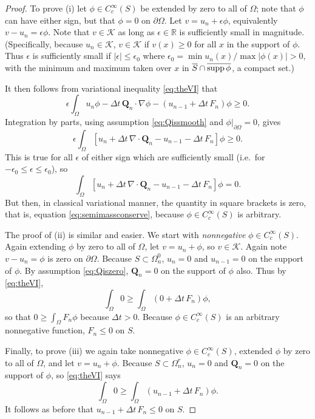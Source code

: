 \documentclass[final,leqno,onefignum,onetabnum]{siamltex1213bueler}
\newcommand\bQ{\mathbf{Q}}
\newcommand{\Div}{\nabla\cdot}
\newcommand\eps{\epsilon}
\renewcommand{\grad}{\nabla}
\newcommand\RR{\mathbb{R}}
\begin{document}
\begin{proof}  To prove (i) let $\phi\in C_c^\infty(S)$ be extended by zero to all of $\Omega$; note that $\phi$ can have either sign, but that $\phi=0$ on $\partial\Omega$.  Let $v = u_n + \eps \phi$, equivalently $v-u_n = \eps \phi$.  Note that $v \in \mathcal{K}$ as long as $\eps\in\RR$ is sufficiently small in magnitude.  (Specifically, because $u_n\in\mathcal{K}$, $v\in\mathcal{K}$ if $v(x)\ge 0$ for all $x$ in the support of $\phi$.  Thus $\eps$ is sufficiently small if $|\eps|\le \eps_0$ where $\eps_0 = \min u_n(x) / \max |\phi(x)| > 0$, with the minimum and maximum taken over $x$ in $\overline{S}\cap \overline{\supp \phi}$, a compact set.)

It then follows from variational inequality \eqref{eq:theVI} that
   $$\eps \int_\Omega u_n \phi - \Delta t\,\bQ_n \cdot \grad \phi - (u_{n-1} + \Delta t\,F_n)\phi \ge 0.$$
Integration by parts, using assumption \eqref{eq:Qissmooth} and $\phi\big|_{\partial\Omega}=0$, gives
   $$\eps \int_\Omega \left[u_n + \Delta t\,\Div\bQ_n - u_{n-1} - \Delta t\,F_n \right]\phi \ge 0.$$
This is true for all $\eps$ of either sign which are sufficiently small (i.e.~for $-\eps_0 \le \eps \le \eps_0$), so
   $$\int_\Omega \left[u_n + \Delta t\,\Div\bQ_n - u_{n-1} - \Delta t\,F_n\right]\phi = 0.$$
But then, in classical variational manner, the quantity in square brackets is zero, that is, equation \eqref{eq:semimassconserve}, because $\phi\in C_c^\infty(S)$ is arbitrary.

The proof of (ii) is similar and easier.  We start with \emph{nonnegative} $\phi\in C_c^\infty(S)$.  Again extending $\phi$ by zero to all of $\Omega$, let $v = u_n + \phi$, so $v\in\mathcal{K}$.  Again note $v-u_n=\phi$ is zero on $\partial \Omega$.  Because $S\subset \Omega_n^0$, $u_n=0$ and $u_{n-1}=0$ on the support of $\phi$.  By assumption \eqref{eq:Qiszero}, $\bQ_n=0$ on the support of $\phi$ also.  Thus by \eqref{eq:theVI},
    $$\int_{\Omega} 0 \ge \int_{\Omega} \left(0 + \Delta t\, F_n\right) \phi,$$
so that $0 \ge \int_{\Omega} F_n \phi$ because $\Delta t>0$.  Because $\phi\in C_c^\infty(S)$ is an arbitrary nonnegative function, $F_n \le 0$ on $S$.

Finally, to prove (iii) we again take nonnegative $\phi\in C_c^\infty(S)$, extended $\phi$ by zero to all of $\Omega$, and let $v=u_n+\phi$.  Because $S\subset \Omega_n^r$, $u_n=0$ and $\bQ_n=0$ on the support of $\phi$, so \eqref{eq:theVI} says
    $$\int_{\Omega} 0 \ge \int_{\Omega} \left(u_{n-1} + \Delta t\, F_n\right) \phi.$$
It follows as before that $u_{n-1} + \Delta t\, F_n \le 0$ on $S$.
\end{proof}
\end{document}
